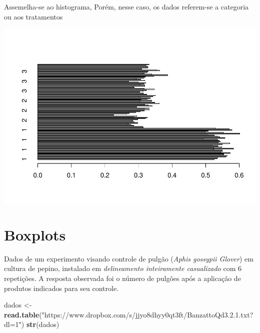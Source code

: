 \documentclass[]{book}
\newenvironment{Shaded}{\begin{snugshade}}{\end{snugshade}}
\newcommand{\DataTypeTok}[1]{\textcolor[rgb]{0.13,0.29,0.53}{#1}}
\newcommand{\KeywordTok}[1]{\textcolor[rgb]{0.13,0.29,0.53}{\textbf{#1}}}
\newcommand{\NormalTok}[1]{#1}
\newcommand{\OperatorTok}[1]{\textcolor[rgb]{0.81,0.36,0.00}{\textbf{#1}}}
\newcommand{\StringTok}[1]{\textcolor[rgb]{0.31,0.60,0.02}{#1}}
\begin{document}
Assemelha-se ao histograma, Porém, nesse caso, os dados referem-se a categoria ou aos tratamentos

\begin{Shaded}
\end{Shaded}

\includegraphics{TudodoR_files/figure-latex/unnamed-chunk-169-1.pdf}

\hypertarget{boxplots}{%
\section{Boxplots}\label{boxplots}}

Dados de um experimento visando controle de pulgão (\emph{Aphis gossypii Glover}) em cultura de pepino, instalado em \emph{delineamento inteiramente casualizado} com 6 repetições. A resposta observada foi o número de pulgões após a aplicação de produtos indicados para seu controle.

\begin{Shaded}
\begin{Highlighting}[]
\NormalTok{dados <-}\StringTok{ }\KeywordTok{read.table}\NormalTok{(}\StringTok{"https://www.dropbox.com/s/jjyo8dhyy0qt3ft/BanzattoQd3.2.1.txt?dl=1"}\NormalTok{)}
\KeywordTok{str}\NormalTok{(dados)}
\end{Highlighting}
\end{Shaded}
\end{document}
